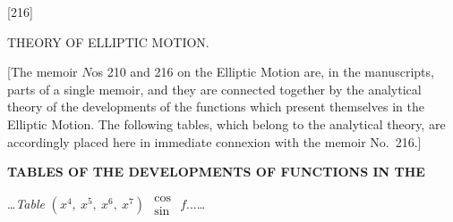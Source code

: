 \documentclass[10pt,a4paper]{article}
\newcommand{\tabletitle}[2]{%
  \begin{center}
  \ldots\textit{Table} #1 $\displaystyle\begin{smallmatrix} \cos \\ \sin \end{smallmatrix}$ #2\ldots
  \end{center}
}
\begin{document}
\begin{center}
\Large[216]

\vspace{0.5em}
\Large THEORY OF ELLIPTIC MOTION.
\end{center}

\vspace{1em}

\noindent
{\small [The memoir \(N\)os 210 and 216 on the Elliptic Motion are, in the manuscripts, parts of a single memoir, and they are connected together by the analytical theory of the developments of the functions which present themselves in the Elliptic Motion.  The following tables, which belong to the analytical theory, are accordingly placed here in immediate connexion with the memoir No.\ 216.]}

\vspace{1em}

\begin{center}
\textbf{\large TABLES OF THE DEVELOPMENTS OF FUNCTIONS IN THE}
\end{center}

\vspace{0.5em}

\tabletitle{$(x^4,\ x^5,\ x^6,\ x^7)$}{$f\ldots$}
\end{document}
